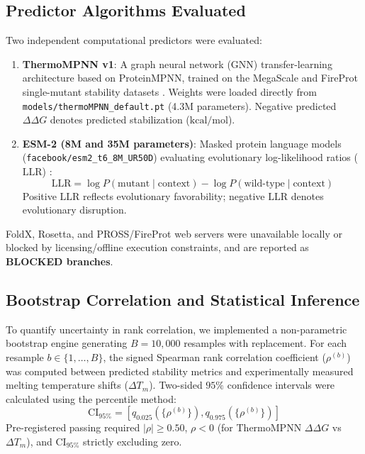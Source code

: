 \documentclass[10pt,twocolumn]{article}
\begin{document}
\subsection{Predictor Algorithms Evaluated}
Two independent computational predictors were evaluated:
\begin{enumerate}
    \item \textbf{ThermoMPNN v1}: A graph neural network (GNN) transfer-learning architecture based on ProteinMPNN, trained on the MegaScale and FireProt single-mutant stability datasets \cite{dieckhaus2024transfer}. Weights were loaded directly from \texttt{models/thermoMPNN\_default.pt} (4.3M parameters). Negative predicted $\Delta\Delta G$ denotes predicted stabilization ($\text{kcal/mol}$).
    \item \textbf{ESM-2 (8M and 35M parameters)}: Masked protein language models (\texttt{facebook/esm2\_t6\_8M\_UR50D}) evaluating evolutionary log-likelihood ratios ($\text{LLR}$) \cite{lin2023evolutionary}:
    \begin{equation}
        \text{LLR} = \log P(\text{mutant} \mid \text{context}) - \log P(\text{wild-type} \mid \text{context})
    \end{equation}
    Positive $\text{LLR}$ reflects evolutionary favorability; negative $\text{LLR}$ denotes evolutionary disruption.
\end{enumerate}
FoldX, Rosetta, and PROSS/FireProt web servers were unavailable locally or blocked by licensing/offline execution constraints, and are reported as \textbf{BLOCKED branches}.

\subsection{Bootstrap Correlation and Statistical Inference}
To quantify uncertainty in rank correlation, we implemented a non-parametric bootstrap engine generating $B = 10,000$ resamples with replacement. For each resample $b \in \{1, \dots, B\}$, the signed Spearman rank correlation coefficient ($\rho^{(b)}$) was computed between predicted stability metrics and experimentally measured melting temperature shifts ($\Delta T_m$). Two-sided $95\%$ confidence intervals were calculated using the percentile method:
\begin{equation}
    \text{CI}_{95\%} = \left[ q_{0.025}\left(\{\rho^{(b)}\}\right), q_{0.975}\left(\{\rho^{(b)}\}\right) \right]
\end{equation}
Pre-registered passing required $|\rho| \geq 0.50$, $\rho < 0$ (for ThermoMPNN $\Delta\Delta G$ vs $\Delta T_m$), and $\text{CI}_{95\%}$ strictly excluding zero.
\end{document}
